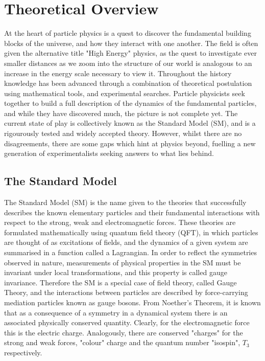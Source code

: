 \chapter{Theoretical Overview}

At the heart of particle physics is a quest to discover the fundamental building blocks of the universe, and how they interact with one another. The field is often given the alternative title "High Energy" physics, as the quest to investigate ever smaller distances as we zoom into the structure of our world is analogous to an increase in the energy scale necessary to view it. Throughout the history knowledge has been advanced through a combination of theoretical postulation using mathematical tools, and experimental searches. Particle physicists seek together to build a full description of the dynamics of the fundamental particles, and while they have discovered much, the picture is not complete yet. The current state of play is collectively known as the Standard Model (SM), and is a rigourously tested and widely accepted theory. However, whilst there are no disagreements, there are some gaps which hint at physics beyond, fuelling a new generation of experimentalists seeking answers to what lies behind.

\section{The Standard Model}

The Standard Model (SM) is the name given to the theories that successfully describes the known elementary particles and their fundamental interactions with respect to the strong, weak and electromagnetic forces.  These theories are formulated mathematically using quantum field theory (QFT), in which particles are thought of as excitations of fields, and the dynamics of a given system are summarised in a function called a Lagrangian. In order to reflect the symmetries observed in nature, measurements of physical properties in the SM must be invariant under local transformations, and this property is called gauge invariance. Therefore the SM is a special case of field theory, called Gauge Theory, and the interactions between particles are described by force-carrying mediation particles known as gauge bosons. From Noether's Theorem, it is known that as a consequence of a symmetry in a dynamical system there is an associated physically conserved quantity\cite{Rolnick}. Clearly, for the electromagnetic force this is the electric charge. Analogously, there are conserved "charges" for the strong and weak forces, "colour" charge and the quantum number "isospin", $T_{3}$ respectively. 
 
